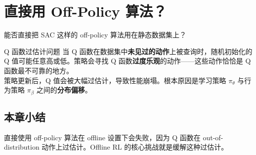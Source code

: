\section{直接用 Off-Policy 算法？}

能否直接把 SAC 这样的 off-policy 算法用在静态数据集上？

\begin{warningbox}{Q 函数过估计问题}
当 Q 函数在数据集中\textbf{未见过的动作}上被查询时，随机初始化的 Q 值可能任意高或低。策略会寻找 Q 函数\textbf{过度乐观}的动作——这些动作恰恰是 Q 函数最不可靠的地方。
\\[6pt]
策略更新后，Q 值会被大幅过估计，导致性能崩塌。根本原因是学习策略 $\pi_\theta$ 与行为策略 $\pi_\beta$ 之间的\textbf{分布偏移}。
\end{warningbox}

\subsection{本章小结}

直接使用 off-policy 算法在 offline 设置下会失败，因为 Q 函数在 out-of-distribution 动作上过估计。Offline RL 的核心挑战就是缓解这种过估计。

